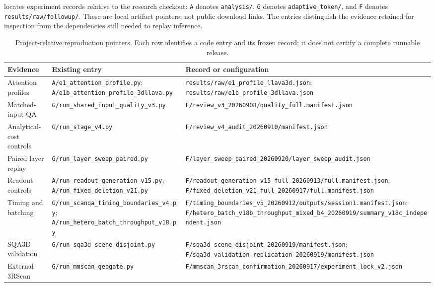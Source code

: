  locates experiment records relative to the research checkout: \texttt{A} denotes \texttt{analysis/}, \texttt{G} denotes \texttt{adaptive\_token/}, and \texttt{F} denotes \texttt{results/raw/followup/}. These are local artifact pointers, not public download links. The entries distinguish the evidence retained for inspection from the dependencies still needed to replay inference.

\begin{table}[t]
\centering
\caption{Project-relative reproduction pointers. Each row identifies a code entry and its frozen record; it does not certify a complete runnable release.}
\label{tab:supp_repro_entries}
\begin{tabular}{@{}>{\raggedright\arraybackslash}p{}>{\raggedright\arraybackslash}p{}>{\raggedright\arraybackslash}p{}@{}}
\toprule
Evidence & Existing entry & Record or configuration \\
\midrule
Attention profiles & \nolinkurl{A/e1_attention_profile.py};
\nolinkurl{A/e1b_attention_profile_3dllava.py} &
\nolinkurl{results/raw/e1_profile_llava3d.json};
\nolinkurl{results/raw/e1b_profile_3dllava.json} \\
Matched-input QA & \nolinkurl{G/run_shared_input_quality_v3.py} &
\nolinkurl{F/review_v3_20260908/quality_full.manifest.json} \\
Analytical-cost controls & \nolinkurl{G/run_stage_v4.py} &
\nolinkurl{F/review_v4_audit_20260910/manifest.json} \\
Paired layer replay & \nolinkurl{G/run_layer_sweep_paired.py} &
\nolinkurl{F/layer_sweep_paired_20260920/layer_sweep_audit.json} \\
Readout controls & \nolinkurl{A/run_readout_generation_v15.py};
\nolinkurl{A/run_fixed_deletion_v21.py} &
\nolinkurl{F/readout_generation_v15_full_20260913/full.manifest.json};
\nolinkurl{F/fixed_deletion_v21_full_20260917/full.manifest.json} \\
Timing and batching & \nolinkurl{G/run_scanqa_timing_boundaries_v4.py};
\nolinkurl{A/run_hetero_batch_throughput_v18.py} &
\nolinkurl{F/timing_boundaries_v5_20260912/outputs/session1.manifest.json};
\nolinkurl{F/hetero_batch_v18b_throughput_mixed_b4_20260919/summary_v18c_independent.json} \\
SQA3D validation & \nolinkurl{G/run_sqa3d_scene_disjoint.py} &
\nolinkurl{F/sqa3d_scene_disjoint_20260919/manifest.json};
\nolinkurl{F/sqa3d_validation_replication_20260919/manifest.json} \\
External 3RScan & \nolinkurl{G/run_mmscan_geogate.py} &
\nolinkurl{F/mmscan_3rscan_confirmation_20260917/experiment_lock_v2.json} \\
\bottomrule
\end{tabular}
\end{table}

